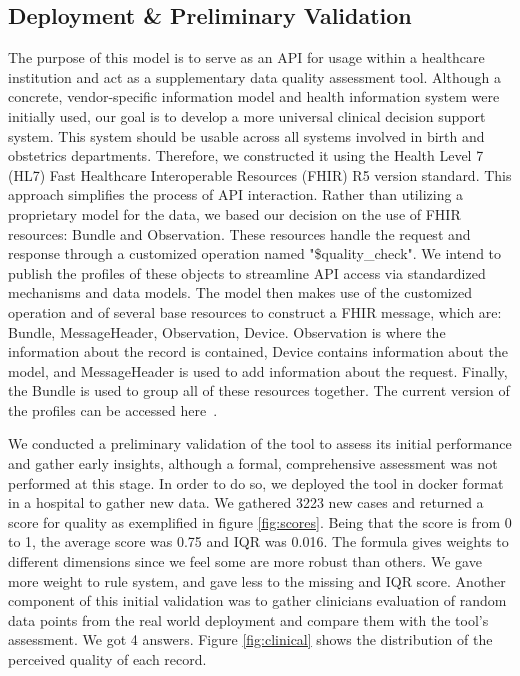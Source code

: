 




\subsection{Deployment \& Preliminary Validation}

The purpose of this model is to serve as an API for usage within a healthcare institution and act as a supplementary data quality assessment tool. Although a concrete, vendor-specific information model and health information system were initially used, our goal is to develop a more universal clinical decision support system. This system should be usable across all systems involved in birth and obstetrics departments. Therefore, we constructed it using the Health Level 7 (HL7) Fast Healthcare Interoperable Resources (FHIR) R5 version standard. This approach simplifies the process of API interaction. Rather than utilizing a proprietary model for the data, we based our decision on the use of FHIR resources: Bundle and Observation. These resources handle the request and response through a customized operation named "\$quality\_check". We intend to publish the profiles of these objects to streamline API access via standardized mechanisms and data models. The model then makes use of the customized operation and of several base resources to construct a FHIR message, which are: Bundle, MessageHeader, Observation, Device. Observation is where the information about the record is contained, Device contains information about the model, and MessageHeader is used to add information about the request. Finally, the Bundle is used to group all of these resources together. The current version of the profiles can be accessed here\unskip~\cite{obs-ig}. 

We conducted a preliminary validation of the tool to assess its initial performance and gather early insights, although a formal, comprehensive assessment was not performed at this stage. In order to do so, we deployed the tool in docker format in a hospital to gather new data. We gathered 3223 new cases and returned a score for quality as exemplified in figure \ref{fig:scores}. Being that the score is from 0 to 1, the average score was 0.75 and IQR was 0.016. The formula gives weights to different dimensions since we feel some are more robust than others. We gave more weight to rule system, and gave less to the missing and IQR score. Another component of this initial validation was to gather clinicians evaluation of random data points from the real world deployment and compare them with the tool's assessment. We got 4 answers. Figure \ref{fig:clinical} shows the distribution of the perceived quality of each record.


